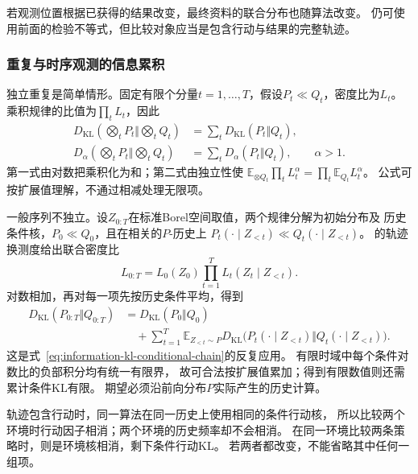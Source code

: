 若观测位置根据已获得的结果改变，最终资料的联合分布也随算法改变。
仍可使用前面的检验不等式，但比较对象应当是包含行动与结果的完整轨迹。

\subsubsection{重复与时序观测的信息累积}
\label{sec:information-sequential-accumulation}

独立重复是简单情形。固定有限个分量\(t=1,\ldots,T\)，假设\(P_t\ll Q_t\)，密度比为\(L_t\)。
乘积规律的比值为\(\prod_tL_t\)，因此
\[
\begin{aligned}
  D_{\mathrm{KL}}\left(\bigotimes_tP_t\Big\Vert\bigotimes_tQ_t\right)
     &=\sum_tD_{\mathrm{KL}}(P_t\Vert Q_t),\\
  D_\alpha\left(\bigotimes_tP_t\Big\Vert\bigotimes_tQ_t\right)
     &=\sum_tD_\alpha(P_t\Vert Q_t),\qquad\alpha>1.
\end{aligned}
\]
第一式由对数把乘积化为和；第二式由独立性使
\(\mathbb E_{\otimes Q_t}\prod_tL_t^\alpha=\prod_t\mathbb E_{Q_t}L_t^\alpha\)。
公式可按扩展值理解，不通过相减处理无限项。

一般序列不独立。设\(Z_{0:T}\)在标准Borel空间取值，两个规律分解为初始分布及
历史条件核，\(P_0\ll Q_0\)，且在相关的\(P\)-历史上
\(P_t(\cdot\mid Z_{<t})\ll Q_t(\cdot\mid Z_{<t})\)。
的轨迹换测度给出联合密度比
\[
  L_{0:T}=L_0(Z_0)\prod_{t=1}^T L_t(Z_t\mid Z_{<t}).
\]
对数相加，再对每一项先按历史条件平均，得到
\begin{equation}
\begin{aligned}
 D_{\mathrm{KL}}(P_{0:T}\Vert Q_{0:T})
 &=D_{\mathrm{KL}}(P_0\Vert Q_0)\\
 &\quad+\sum_{t=1}^T\mathbb E_{Z_{<t}\sim P}
 D_{\mathrm{KL}}\bigl(P_t(\cdot\mid Z_{<t})
                     \Vert Q_t(\cdot\mid Z_{<t})\bigr).
\end{aligned}
\label{eq:information-trajectory-kl-chain}
\end{equation}
这是式~\eqref{eq:information-kl-conditional-chain}的反复应用。
有限时域中每个条件对数比的负部积分均有统一有限界，
故可合法按扩展值累加；得到有限数值则还需累计条件KL有限。
期望必须沿前向分布\(P\)实际产生的历史计算。

轨迹包含行动时，同一算法在同一历史上使用相同的条件行动核，
所以比较两个环境时行动因子相消；两个环境的历史频率却不会相消。
在同一环境比较两条策略时，则是环境核相消，剩下条件行动KL。
若两者都改变，不能省略其中任何一组项。

